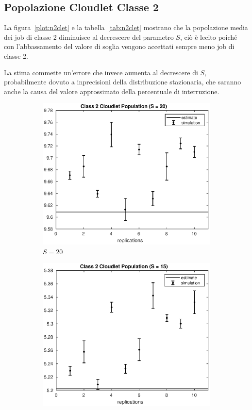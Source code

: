 \subsection{Popolazione Cloudlet Classe 2}
La figura~\ref{plot:n2clet} e la tabella~\ref{tab:n2clet} mostrano che la
popolazione media dei job di classe 2 diminuisce al decrescere del parametro
$S$, ciò è lecito poiché con l'abbassamento del valore di soglia vengono
accettati sempre meno job di classe 2.

La stima commette un'errore che invece aumenta al decrescere di $S$,
probabilmente dovuto a inprecisioni della distribuzione stazionaria, che saranno
anche la causa del valore approssimato della percentuale di interruzione.
\begin{figure}[!h]
\centering
%
\begin{subfigure}[t]{0.49\textwidth}
\includegraphics[width=\textwidth]{figures/simul/20_500K_n2clet}
\caption{$S = 20$}
\label{20_n2clet}
\end{subfigure}
%
\begin{subfigure}[t]{0.49\textwidth}
\includegraphics[width=\textwidth]{figures/simul/15_500K_n2clet}

\end{subfigure}
\end{figure}
